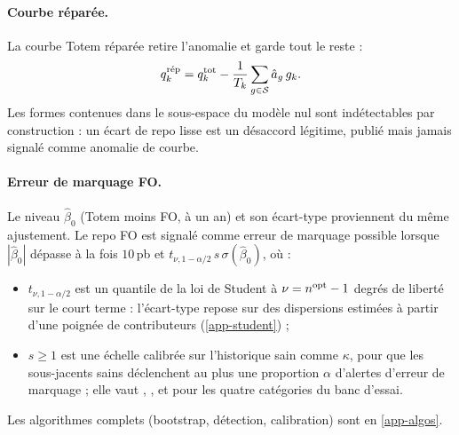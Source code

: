 \paragraph{Courbe réparée.} La courbe Totem réparée retire l'anomalie et garde tout le reste :
\[
q^{\text{rép}}_k=q^{\mathrm{tot}}_k-\frac{1}{T_k}\sum_{g\in\mathcal S}\hat a_g\,g_k .
\]
Les formes contenues dans le sous-espace du modèle nul sont indétectables par construction : un écart de repo lisse
est un désaccord légitime, publié mais jamais signalé comme anomalie de courbe.

\paragraph{Erreur de marquage FO.} Le niveau $\hat\beta_0$ (Totem moins FO, à un an) et son écart-type proviennent du
même ajustement. Le repo FO est signalé comme erreur de marquage possible lorsque $|\hat\beta_0|$ dépasse à la fois
$10$\,pb et $t_{\nu,1-\alpha/2}\,s\,\sigma(\hat\beta_0)$, où :
\begin{itemize}
\item $t_{\nu,1-\alpha/2}$ est un quantile de la loi de Student à $\nu=n^{\mathrm{opt}}-1$ degrés de liberté sur le court
terme : l'écart-type repose sur des dispersions estimées à partir d'une poignée de contributeurs
(\cref{app-student}) ;
\item $s\ge1$ est une échelle calibrée sur l'historique sain comme $\kappa$, pour que les sous-jacents sains déclenchent
au plus une proportion $\alpha$ d'alertes d'erreur de marquage ; elle vaut \vLevelScaleEuStock, \vLevelScaleUsStock,
\vLevelScaleHtb{} et \vLevelScaleIndex{} pour les quatre catégories du banc d'essai.
\end{itemize}
Les algorithmes complets (bootstrap, détection, calibration) sont en \cref{app-algos}.


